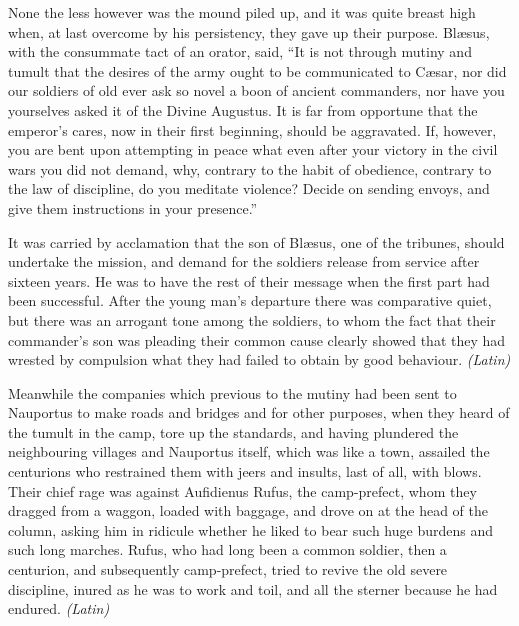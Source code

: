 
None the less however was the mound piled up, and it was quite breast high when, at last overcome by his persistency, they gave up their purpose. Blæsus, with the consummate tact of an orator, said, ``It is not through mutiny and tumult that the desires of the army ought to be communicated to Cæsar, nor did our soldiers of old ever ask so novel a boon of ancient commanders, nor have you yourselves asked it of the Divine Augustus. It is far from opportune that the emperor's cares, now in their first beginning, should be aggravated. If, however, you are bent upon attempting in peace what even after your victory in the civil wars you did not demand, why, contrary to the habit of obedience, contrary to the law of discipline, do you meditate violence? Decide on sending envoys, and give them instructions in your presence.''

It was carried by acclamation that the son of Blæsus, one of the tribunes, should undertake the mission, and demand for the soldiers release from service after sixteen years. He was to have the rest of their message when the first part had been successful. After the young man's departure there was comparative quiet, but there was an arrogant tone among the soldiers, to whom the fact that their commander's son was pleading their common cause clearly showed that they had wrested by compulsion what they had failed to obtain by good behaviour. \emph{(Latin)}


Meanwhile the companies which previous to the mutiny had been sent to Nauportus to make roads and bridges and for other purposes, when they heard of the tumult in the camp, tore up the standards, and having plundered the neighbouring villages and Nauportus itself, which was like a town, assailed the centurions who restrained them with jeers and insults, last of all, with blows. Their chief rage was against Aufidienus Rufus, the camp-prefect, whom they dragged from a waggon, loaded with baggage, and drove on at the head of the column, asking him in ridicule whether he liked to bear such huge burdens and such long marches. Rufus, who had long been a common soldier, then a centurion, and subsequently camp-prefect, tried to revive the old severe discipline, inured as he was to work and toil, and all the sterner because he had endured. \emph{(Latin)}



